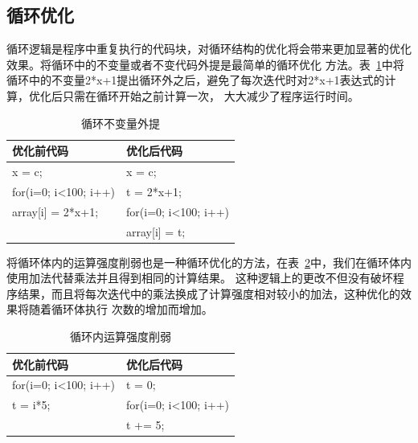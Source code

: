 \subsection{循环优化}
循环逻辑是程序中重复执行的代码块，对循环结构的优化将会带来更加显著的优化效果。将循环中的不变量或者不变代码外提是最简单的循环优化
方法。表~\ref{table4}中将循环中的不变量2*x+1提出循环外之后，避免了每次迭代时对2*x+1表达式的计算，优化后只需在循环开始之前计算一次，
大大减少了程序运行时间。
\begin{table}[h]
  \centering
  \caption{循环不变量外提}
  \begin{tabular}{p{7cm}<{\centering}p{7cm}<{\centering}}
    \hline
    优化前代码             & 优化后代码   \\
    \hline
    x = c;                    & x = c;    \\
    for(i=0; i<100; i++)      & t = 2*x+1; \\
      array[i] = 2*x+1;       & for(i=0; i<100; i++) \\
	                          &    array[i] = t;  \\
   \hline
  \end{tabular}
  \label{table4}
\end{table}
将循环体内的运算强度削弱也是一种循环优化的方法，在表~\ref{table5}中，我们在循环体内使用加法代替乘法并且得到相同的计算结果。
这种逻辑上的更改不但没有破坏程序结果，而且将每次迭代中的乘法换成了计算强度相对较小的加法，这种优化的效果将随着循环体执行
次数的增加而增加。
\begin{table}[h]
  \centering
  \caption{循环内运算强度削弱}
  \begin{tabular}{p{7cm}<{\centering}p{7cm}<{\centering}}
    \hline
    优化前代码             & 优化后代码   \\
    \hline
    for(i=0; i<100; i++)      & t = 0; \\
       t = i*5;                & for(i=0; i<100; i++)\\ 
                             &    t += 5;\\
  \hline
  \end{tabular}
  \label{table5}
\end{table}











